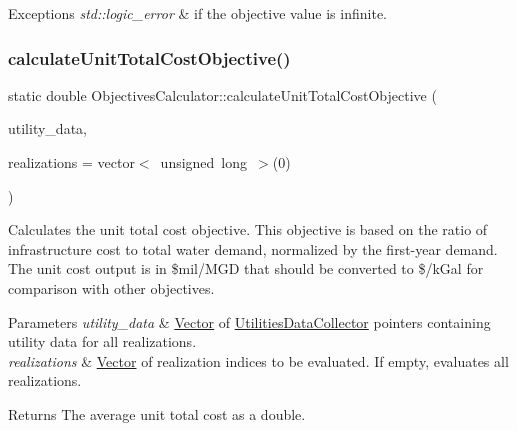 \begin{DoxyExceptions}{Exceptions}
{\em std\+::logic\+\_\+error} & if the objective value is infinite. \\
\hline
\end{DoxyExceptions}
\mbox{\label{classObjectivesCalculator_a90547ef235596c39aa1bfe556d98b9f6}} 
\subsubsection{\texorpdfstring{calculate\+Unit\+Total\+Cost\+Objective()}{calculateUnitTotalCostObjective()}}
{\footnotesize\ttfamily static double Objectives\+Calculator\+::calculate\+Unit\+Total\+Cost\+Objective (\begin{DoxyParamCaption}\item[{const vector$<$ \mbox{\hyperlink{classUtilitiesDataCollector}{Utilities\+Data\+Collector}} $\ast$$>$ \&}]{utility\+\_\+data,  }\item[{vector$<$ unsigned long $>$}]{realizations = {\ttfamily vector$<$~unsigned~long~$>$(0)} }\end{DoxyParamCaption})\hspace{0.3cm}{\ttfamily [static]}}



Calculates the unit total cost objective. This objective is based on the ratio of infrastructure cost to total water demand, normalized by the first-\/year demand. The unit cost output is in \$mil/\+M\+GD that should be converted to \$/k\+Gal for comparison with other objectives. 


\begin{DoxyParams}{Parameters}
{\em utility\+\_\+data} & \mbox{\hyperlink{classVector}{Vector}} of {\ttfamily \mbox{\hyperlink{classUtilitiesDataCollector}{Utilities\+Data\+Collector}}} pointers containing utility data for all realizations. \\
\hline
{\em realizations} & \mbox{\hyperlink{classVector}{Vector}} of realization indices to be evaluated. If empty, evaluates all realizations.\\
\hline
\end{DoxyParams}
\begin{DoxyReturn}{Returns}
The average unit total cost as a double. 
\end{DoxyReturn}
\mbox{\label{classObjectivesCalculator_aaa5a9bb621c4346e106809f58afe1bd1}} 
